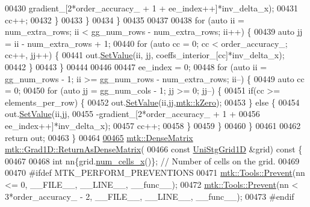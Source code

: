 \begin{DoxyCode}
{{00430                      gradient\_[2*order\_accuracy\_ + 1 + ee\_index++]*inv\_delta\_x);
00431         cc++;
00432       \}
00433     \}
00434   \}
00435 
00437 
00438   \textcolor{keywordflow}{for} (\textcolor{keyword}{auto} ii = num\_extra\_rows; ii < gg\_num\_rows - num\_extra\_rows; ii++) \{
00439     \textcolor{keyword}{auto} jj = ii - num\_extra\_rows + 1;
00440     \textcolor{keywordflow}{for} (\textcolor{keyword}{auto} cc = 0; cc < order\_accuracy\_; cc++, jj++) \{
00441       out.\hyperlink{classmtk_1_1DenseMatrix_a784ce5784109ac86bfb9d8562b334b13}{SetValue}(ii, jj, coeffs\_interior\_[cc]*inv\_delta\_x);
00442     \}
00443   \}
00444 
00446 
00447   ee\_index = 0;
00448   \textcolor{keywordflow}{for} (\textcolor{keyword}{auto} ii = gg\_num\_rows - 1; ii >= gg\_num\_rows - num\_extra\_rows; ii--) \{
00449     \textcolor{keyword}{auto} cc = 0;
00450     \textcolor{keywordflow}{for} (\textcolor{keyword}{auto} jj = gg\_num\_cols - 1; jj >= 0; jj--) \{
00451       \textcolor{keywordflow}{if}(cc >= elements\_per\_row) \{
00452         out.\hyperlink{classmtk_1_1DenseMatrix_a784ce5784109ac86bfb9d8562b334b13}{SetValue}(ii,jj,\hyperlink{group__c01-roots_ga59a451a5fae30d59649bcda274fea271}{mtk::kZero});
00453       \} \textcolor{keywordflow}{else} \{
00454         out.\hyperlink{classmtk_1_1DenseMatrix_a784ce5784109ac86bfb9d8562b334b13}{SetValue}(ii,jj,
00455                      -gradient\_[2*order\_accuracy\_ + 1 +
00456 ee\_index++]*inv\_delta\_x);
00457         cc++;
00458       \}
00459      \}
00460   \}
00461 
00462   \textcolor{keywordflow}{return} out;
00463 \}
00464 
\hypertarget{mtk__grad__1d_8cc_source_l00465}{}\hyperlink{classmtk_1_1Grad1D_a871a3b31e257b04d5e303b3211df3a73}{00465} \hyperlink{classmtk_1_1DenseMatrix}{mtk::DenseMatrix} \hyperlink{classmtk_1_1Grad1D_a77b2eddbe4ab03f469306c604d505b1a}{mtk::Grad1D::ReturnAsDenseMatrix}(
00466   \textcolor{keyword}{const} \hyperlink{classmtk_1_1UniStgGrid1D}{UniStgGrid1D} &grid)\textcolor{keyword}{ const }\{
00467 
00468   \textcolor{keywordtype}{int} nn\{grid.\hyperlink{classmtk_1_1UniStgGrid1D_af1b3729d8afa07be5b2775ed68015b80}{num\_cells\_x}()\}; \textcolor{comment}{// Number of cells on the grid.}
00469 
00470 \textcolor{preprocessor}{  #ifdef MTK\_PERFORM\_PREVENTIONS}
00471   \hyperlink{classmtk_1_1Tools_a332324c6f25e66be9dff48c5987a3b9f}{mtk::Tools::Prevent}(nn <= 0, \_\_FILE\_\_, \_\_LINE\_\_, \_\_func\_\_);
00472   \hyperlink{classmtk_1_1Tools_a332324c6f25e66be9dff48c5987a3b9f}{mtk::Tools::Prevent}(nn < 3*order\_accuracy\_ - 2, \_\_FILE\_\_, \_\_LINE\_\_, \_\_func\_\_);
00473 \textcolor{preprocessor}{  #endif}
}}
\end{DoxyCode}
